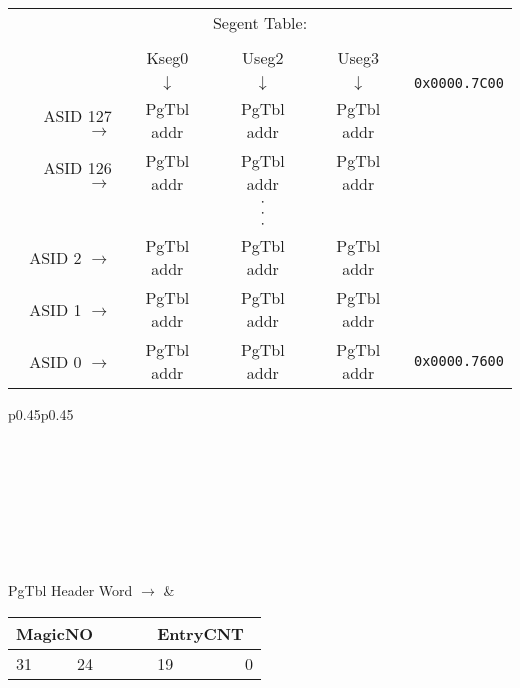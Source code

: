 {
\centering
\begin{tabular}{r|c|c|c|l}
\multicolumn{5}{c}{Segent Table:} \\
\multicolumn{5}{c}{}\\
\multicolumn{1}{c}{} & \multicolumn{1}{c}{Kseg0} & \multicolumn{1}{c}{Useg2} & \multicolumn{1}{c}{Useg3} & \multicolumn{1}{c}{} \\
\multicolumn{1}{c}{} & \multicolumn{1}{c}{$\downarrow$} & \multicolumn{1}{c}{$\downarrow$} & \multicolumn{1}{c}{$\downarrow$} & \multicolumn{1}{c}{\texttt{0x0000.7C00}} \\
\cline{2-4}
ASID 127 $\rightarrow$ & PgTbl addr & PgTbl addr & PgTbl addr & \\
\cline{2-4}
ASID 126 $\rightarrow$ & PgTbl addr & PgTbl addr & PgTbl addr & \\
\cline{2-4}
\multicolumn{1}{c}{} & \multicolumn{1}{c}{} & \multicolumn{1}{c}{$\cdot$} & \multicolumn{1}{c}{} & \multicolumn{1}{c}{} \\
\multicolumn{1}{c}{} & \multicolumn{1}{c}{} & \multicolumn{1}{c}{$\cdot$} & \multicolumn{1}{c}{} & \multicolumn{1}{c}{} \\
\multicolumn{1}{c}{} & \multicolumn{1}{c}{} & \multicolumn{1}{c}{$\cdot$} & \multicolumn{1}{c}{} & \multicolumn{1}{c}{} \\
\cline{2-4}
ASID 2 $\rightarrow$ & PgTbl addr & PgTbl addr & PgTbl addr & \\
\cline{2-4}
ASID 1 $\rightarrow$ & PgTbl addr & PgTbl addr & PgTbl addr & \\
\cline{2-4}
ASID 0 $\rightarrow$ & PgTbl addr & PgTbl addr & PgTbl addr & \texttt{0x0000.7600} \\
\cline{2-4}
\end{tabular}

\centering
\begin{tabular}{p{}p{}}
 \\
\\
\hline
{}\\
\hline
{}\\
\\
\\
\hline
{}\\
\hline
{}\\
\hline
{}\\
\hline
\hfill PgTbl Header Word $\rightarrow$ & 
	\begin{tabular}{lrclr}
	\multicolumn{2}{|c|}{MagicNO} & \cellcolor{gray}& \multicolumn{2}{|c|}{\hspace{14px}EntryCNT\hspace{11px}\ } \\
	\hline
	\footnotesize{31} & \footnotesize{24} & \ \ \ \ & \footnotesize{19} & \footnotesize{0} \\
	\end{tabular}
\end{tabular}
}
